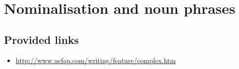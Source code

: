 
\chapter{Nominalisation and noun phrases}

\section{Provided links}

\begin{itemize}
    \item \url{http://www.uefap.com/writing/feature/complex.htm}
\end{itemize}
